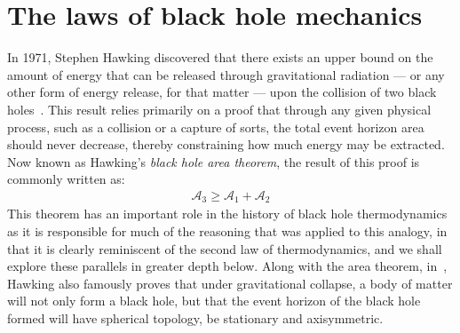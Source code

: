 \documentclass[
twoside,
openright,
frontopenright,
]{dmathesis}
\begin{document}
\section{The laws of black hole mechanics}
\label{sec:fourlaws}

In 1971, Stephen Hawking discovered that there exists an upper bound on the
amount of energy that can be released through gravitational radiation --- or any
other form of energy release, for that matter --- upon the collision of two
black holes~\cite{Hawking:1971tu,Hawking:1971vc}. This result relies primarily
on a proof that through any given physical process, such as a collision or a
capture of sorts, the total event horizon area should never decrease, thereby
constraining how much energy may be extracted. Now known as Hawking's
\emph{black hole area theorem}, the result of this proof is commonly written as:
\begin{align}
  \label{eq:areatheorem}
  \mathcal{A}_3 \geqslant \mathcal{A}_1+\mathcal{A}_2
\end{align}
This theorem has an important role in the history of black hole thermodynamics
as it is responsible for much of the reasoning that was applied to this analogy,
in that it is clearly reminiscent of the second law of thermodynamics, and we
shall explore these parallels in greater depth below. Along with the area
theorem, in~\cite{Hawking:1971vc}, Hawking also famously proves that under
gravitational collapse, a body of matter will not only form a black hole, but
that the event horizon of the black hole formed will have spherical topology, be
stationary and axisymmetric.
\end{document}
